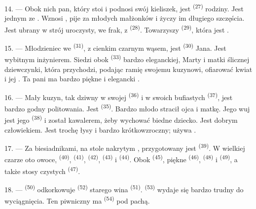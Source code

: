 14. --- Obok nich pan, który stoi i podnosi swój kieliszek, jest 
\textsuperscript{(27)} rodziny. Jest jednym ze . Wznosi
, pije za  młodych małżonków i życzy im długiego
szczęścia. Jest ubrany w strój uroczysty, we frak, z 
\textsuperscript{(28)}. Towarzyszy  \textsuperscript{(29)}, która jest
.

15. --- Młodzieniec we  \textsuperscript{(31)}, z cienkim czarnym wąsem,
jest  \textsuperscript{(30)} Jana. Jest wybitnym inżynierem. Siedzi
obok  \textsuperscript{(33)} bardzo eleganckiej,  Marty i matki ślicznej dziewczynki, która przychodzi, podając ramię swojemu
kuzynowi, ofiarować kwiat i  jej . Ta pani ma
bardzo piękne  i elegancki .

16. --- Mały kuzyn, tak dziwny w swojej  \textsuperscript{(36)} i w
swoich bufiastych  \textsuperscript{(37)}, jest bardzo godny
politowania. Jest  \textsuperscript{(35)}. Bardzo młodo stracił ojca i
matkę. Jego wuj jest jego  \textsuperscript{(38)} i został kawalerem,
żeby wychować biedne dziecko. Jest dobrym człowiekiem. Jest trochę łysy i bardzo
krótkowzroczny; używa .

\VUsaut{2.4mm}
\VUsaut{3.0mm}

17. --- Za biesiadnikami, na stole nakrytym , przygotowany jest
 \textsuperscript{(39)}. W wielkiej czarze oto owoce, 
\textsuperscript{(40)},  \textsuperscript{(41)}, 
\textsuperscript{(42)},  \textsuperscript{(43)} i 
\textsuperscript{(44)}. Obok  \textsuperscript{(45)}, piękne
 \textsuperscript{(46)},  \textsuperscript{(48)}
i  \textsuperscript{(49)}, a także stosy czystych 
\textsuperscript{(47)}.

18. ---  \textsuperscript{(50)} odkorkowuje 
\textsuperscript{(52)} starego wina  \textsuperscript{(51)}.
 \textsuperscript{(53)} wydaje się bardzo trudny do wyciągnięcia. Ten
piwniczny ma  \textsuperscript{(54)} pod pachą.

